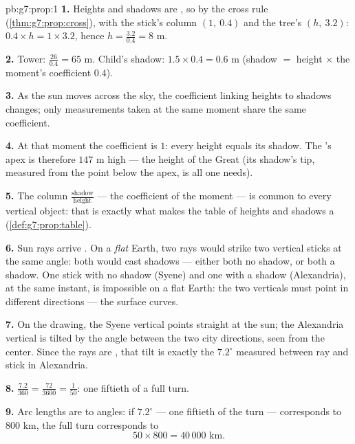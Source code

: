 \begin{solution}{pb:g7:prop:1}
\textbf{1.} Heights and shadows are , so by the
cross rule (\cref{thm:g7:prop:cross}), with the stick's column
$(1,\ 0.4)$ and the tree's $(h,\ 3.2)$:
$0.4 \times h = 1 \times 3.2$, hence
$h = \frac{3.2}{0.4} = 8$ m.

\textbf{2.} Tower: $\frac{26}{0.4} = 65$ m. Child's shadow:
$1.5 \times 0.4 = 0.6$ m (shadow $=$ height $\times$ the
moment's coefficient $0.4$).

\textbf{3.} As the sun moves across the sky, the coefficient
linking heights to shadows changes; only measurements taken at
the same moment share the same coefficient.

\textbf{4.} At that moment the coefficient is $1$: every height
equals its shadow. The 's apex is therefore
$147$ m high --- the height of the Great  (its shadow's
tip, measured from the point below the apex, is all one needs).

\textbf{5.} The column 
$\frac{\text{shadow}}{\text{height}}$ --- the 
coefficient of the moment --- is common to every vertical
object: that is exactly what makes the table of heights and
shadows a  (\cref{def:g7:prop:table}).

\textbf{6.} Sun rays arrive . On a \emph{flat} Earth,
two  rays would strike two vertical sticks at the same
angle: both would cast  shadows --- either both no
shadow, or both a shadow. One stick with no shadow (Syene) and
one with a shadow (Alexandria), at the same instant, is
impossible on a flat Earth: the two verticals must point in
different directions --- the surface curves.

\textbf{7.} On the drawing, the Syene vertical points straight
at the sun; the Alexandria vertical is tilted by the angle
between the two city directions, seen from the center. Since the
rays are , that tilt is exactly the $7.2^\circ$ measured
between ray and stick in Alexandria.

\textbf{8.} $\frac{7.2}{360} = \frac{72}{3600} = \frac{1}{50}$:
one fiftieth of a full turn.

\textbf{9.} Arc lengths are  to angles: if
$7.2^\circ$ --- one fiftieth of the turn --- corresponds to
$800$ km, the full turn corresponds to
\[
50 \times 800 = 40\,000 \text{ km}.
\]


\end{solution}
